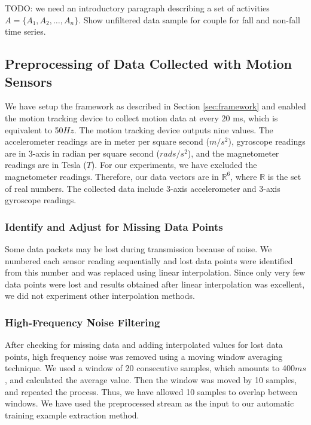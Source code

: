 \documentclass{IEEEtran}
\begin{document}
TODO: we need an introductory paragraph describing a set of activities $A = \{A_1, A_2, 
\dots, A_n\}$. Show unfiltered data sample for couple for fall and non-fall time series. 


\subsection{Preprocessing of Data Collected with Motion Sensors }

We have setup the framework as described in Section \ref{sec:framework} and enabled the 
motion tracking device to collect motion data at every $20$ ms, which is equivalent to 50$Hz$. The motion tracking device outputs nine values. The  
accelerometer readings are in  meter per square second ($m/s^2$), gyroscope readings are 
in 3-axis in radian per square second ($rads/s^2$), and the magnetometer readings are  in 
Tesla ($T$). For our experiments, we have excluded the magnetometer readings. Therefore, 
our data vectors are in $\mathbb{R}^6$, where $\mathbb{R}$ is the set of real numbers. The collected data include 3-axis accelerometer and 3-axis gyroscope  readings.

\subsubsection{Identify and Adjust for Missing Data Points}
\label{sec:IdentifyAndAdjustForMissingDataPoints}
Some data packets may be lost during transmission because of noise. We numbered each sensor reading sequentially and lost data points were identified from this number and was replaced using linear interpolation. Since only very few data points were lost and results obtained after linear interpolation was excellent, we did not experiment other interpolation methods.

\subsubsection{High-Frequency Noise Filtering}
\label{sec:NoiseFiltering}

After checking for missing data and adding interpolated values for lost data points,  high frequency noise was removed using a moving window averaging technique. We used a window  of 20 consecutive samples, which amounts to 400$ms$, 
and calculated the average value. Then the  window was moved by  10 samples, and 
repeated the process. Thus, we have allowed 10 samples to overlap between windows. 
We have used the preprocessed stream as the input to our automatic training example 
extraction method.
\end{document}
